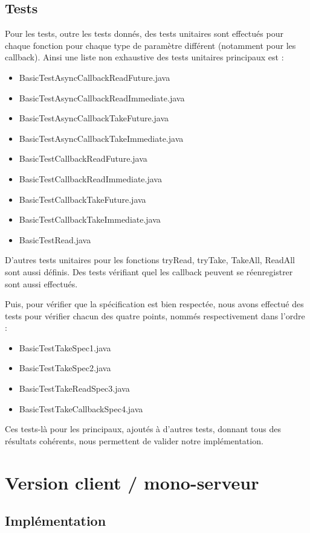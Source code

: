 \documentclass{report}
\begin{document}
\section{Tests}

Pour les tests, outre les tests donnés, des tests unitaires sont effectués pour chaque fonction pour chaque type de paramètre différent (notamment pour les callback). Ainsi une liste non exhaustive des tests unitaires principaux est :
\begin{itemize}
\item BasicTestAsyncCallbackReadFuture.java
\item BasicTestAsyncCallbackReadImmediate.java
\item BasicTestAsyncCallbackTakeFuture.java
\item BasicTestAsyncCallbackTakeImmediate.java
\item BasicTestCallbackReadFuture.java
\item BasicTestCallbackReadImmediate.java
\item BasicTestCallbackTakeFuture.java
\item BasicTestCallbackTakeImmediate.java
\item BasicTestRead.java
\end{itemize}
D'autres tests unitaires pour les fonctions tryRead, tryTake, TakeAll, ReadAll sont aussi définis. Des tests vérifiant quel les callback peuvent se réenregistrer sont aussi effectués.

Puis, pour vérifier que la spécification est bien respectée, nous avons effectué des tests pour vérifier chacun des quatre points, nommés respectivement dans l'ordre :
\begin{itemize}
\item BasicTestTakeSpec1.java
\item BasicTestTakeSpec2.java
\item BasicTestTakeReadSpec3.java
\item BasicTestTakeCallbackSpec4.java
\end{itemize}

Ces tests-là pour les principaux, ajoutés à d'autres tests, donnant tous des résultats cohérents, nous permettent de valider notre implémentation. 

\chapter{Version client / mono-serveur}

\section{Implémentation}
\end{document}
